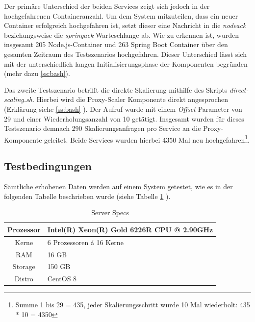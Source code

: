 Der primäre Unterschied der beiden Services zeigt sich jedoch in der hochgefahrenen Containeranzahl. Um dem System mitzuteilen, dass ein neuer Container erfolgreich hochgefahren ist, setzt dieser eine Nachricht in die \emph{nodeack} beziehungsweise die \emph{springack} Warteschlange ab. Wie zu erkennen ist, wurden insgesamt 205 Node.js-Container und 263 Spring Boot Container über den gesamten Zeitraum des Testszenarios hochgefahren. Dieser Unterschied lässt sich mit der unterschiedlich langen Initialisierungsphase der Komponenten begründen (mehr dazu \ref{ss:bash}).

Das zweite Testszenario betrifft die direkte Skalierung mithilfe des Skripts \emph{direct-scaling.sh}. Hierbei wird die Proxy-Scaler Komponente direkt angesprochen (Erklärung siehe \ref{ss:bash} ). Der Aufruf wurde mit einem \emph{Offset} Parameter von 29 und einer Wiederholungsanzahl von 10 getätigt. Insgesamt wurden für dieses Testszenario demnach 290 Skalierungsanfragen pro Service an die Proxy-Komponente geleitet. Beide Services wurden hierbei 4350 Mal neu hochgefahren\footnote{Summe 1 bis 29 = 435, jeder Skalierungsschritt wurde 10 Mal wiederholt: 435 * 10 = 4350}.

\subsection{Testbedingungen}

Sämtliche erhobenen Daten werden auf einem System getestet, wie es in der folgenden Tabelle beschrieben wurde (siehe Tabelle \ref{tab:serverSpecs} ). 

\renewcommand\theadalign{bc}
\renewcommand\theadfont{\bfseries}
\renewcommand\theadgape{\Gape[4pt]}
\renewcommand\cellgape{\Gape[4pt]}

\begin{table}[ht!]
  \centering
  \caption{Server Specs}
  \label{tab:serverSpecs}
  \bigskip
  \begin{tabular}{ c l }
    \toprule
    Prozessor & Intel(R) Xeon(R) Gold 6226R CPU @ 2.90GHz \\
    \midrule
    Kerne & 6 Prozessoren á 16 Kerne \\
    \midrule
    RAM & 16 GB \\
    \midrule
    Storage & 150 GB \\
    \midrule
    Distro & CentOS 8\\
    \bottomrule
  \end{tabular}
\end{table}
